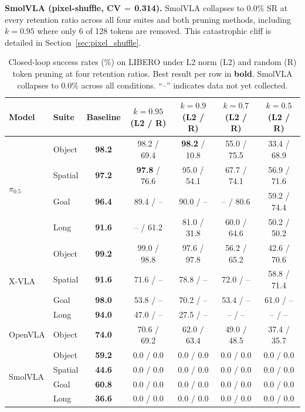 \textbf{SmolVLA (pixel-shuffle, CV$\,{=}\,$0.314).} SmolVLA collapses to 0.0\% SR at every retention ratio across all four suites and both pruning methods, including $k{=}0.95$ where only 6 of 128 tokens are removed. This catastrophic cliff is detailed in Section~\ref{sec:pixel_shuffle}.

\begin{table}[t]
\centering
\small
\caption{Closed-loop success rates (\%) on LIBERO under L2 norm (L2) and random (R) token pruning at four retention ratios. Best result per row in \textbf{bold}. SmolVLA collapses to 0.0\% across all conditions. ``--'' indicates data not yet collected.}
\label{tab:main_results}
\begin{tabular}{llccccc}
\toprule
Model & Suite & Baseline & $k{=}0.95$ (L2 / R) & $k{=}0.9$ (L2 / R) & $k{=}0.7$ (L2 / R) & $k{=}0.5$ (L2 / R) \\
\midrule
\multirow{4}{*}{$\pi_0.5$}
& Object  & \textbf{98.2} & 98.2 / 69.4 & \textbf{98.2} / 10.8 & 55.0 / 75.5 & 33.4 / 68.9 \\
& Spatial & \textbf{97.2} & \textbf{97.8} / 76.6 & 95.0 / 54.1 & 67.7 / 74.1 & 56.9 / 71.6 \\
& Goal    & \textbf{96.4} & 89.4 / -- & 90.0 / -- & -- / 80.6 & 59.2 / 74.4 \\
& Long    & \textbf{91.6} & -- / 61.2 & 81.0 / 31.8 & 60.0 / 64.6 & 50.2 / 50.2 \\
\midrule
\multirow{4}{*}{X-VLA}
& Object  & \textbf{99.2} & 99.0 / 98.8 & 97.6 / 97.8 & 56.2 / 65.2 & 42.6 / 70.6 \\
& Spatial & \textbf{91.6} & 71.6 / -- & 78.8 / -- & 72.0 / -- & 58.8 / 71.4 \\
& Goal    & \textbf{98.0} & 53.8 / -- & 70.2 / -- & 53.4 / -- & 61.0 / -- \\
& Long    & \textbf{94.0} & 47.0 / -- & 27.5 / -- & -- / -- & -- / -- \\
\midrule
OpenVLA & Object & \textbf{74.0} & 70.6 / 69.2 & 62.0 / 63.4 & 49.0 / 48.5 & 37.4 / 35.7 \\
\midrule
\multirow{4}{*}{SmolVLA}
& Object  & \textbf{59.2} & 0.0 / 0.0 & 0.0 / 0.0 & 0.0 / 0.0 & 0.0 / 0.0 \\
& Spatial & \textbf{44.6} & 0.0 / 0.0 & 0.0 / 0.0 & 0.0 / 0.0 & 0.0 / 0.0 \\
& Goal    & \textbf{60.8} & 0.0 / 0.0 & 0.0 / 0.0 & 0.0 / 0.0 & 0.0 / 0.0 \\
& Long    & \textbf{36.6} & 0.0 / 0.0 & 0.0 / 0.0 & 0.0 / 0.0 & 0.0 / 0.0 \\
\bottomrule
\end{tabular}
\end{table}

